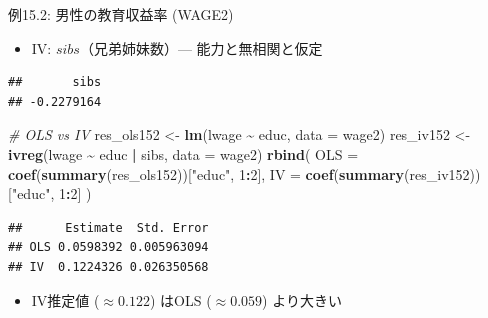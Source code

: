 \documentclass[
  ignorenonframetext,
]{beamer}
\newenvironment{Shaded}{\begin{snugshade}}{\end{snugshade}}
\newcommand{\AttributeTok}[1]{\textcolor[rgb]{0.13,0.29,0.53}{#1}}
\newcommand{\CommentTok}[1]{\textcolor[rgb]{0.56,0.35,0.01}{\textit{#1}}}
\newcommand{\DecValTok}[1]{\textcolor[rgb]{0.00,0.00,0.81}{#1}}
\newcommand{\FunctionTok}[1]{\textcolor[rgb]{0.13,0.29,0.53}{\textbf{#1}}}
\newcommand{\NormalTok}[1]{#1}
\newcommand{\OtherTok}[1]{\textcolor[rgb]{0.56,0.35,0.01}{#1}}
\newcommand{\SpecialCharTok}[1]{\textcolor[rgb]{0.81,0.36,0.00}{\textbf{#1}}}
\newcommand{\StringTok}[1]{\textcolor[rgb]{0.31,0.60,0.02}{#1}}
\providecommand{\tightlist}{%
  \setlength{\itemsep}{0pt}\setlength{\parskip}{0pt}}
\begin{document}
\begin{frame}[fragile]{例15.2: 男性の教育収益率 (WAGE2)}
\label{ux4f8b15.2-ux7537ux6027ux306eux6559ux80b2ux53ceux76caux7387-wage2}
\begin{itemize}
\tightlist
\item
  IV: \(sibs\)（兄弟姉妹数）--- 能力と無相関と仮定
\end{itemize}

\footnotesize

\begin{Shaded}
\end{Shaded}

\begin{verbatim}
##       sibs 
## -0.2279164
\end{verbatim}

\begin{Shaded}
\begin{Highlighting}[]
\CommentTok{\# OLS vs IV}
\NormalTok{res\_ols152 }\OtherTok{\textless{}{-}} \FunctionTok{lm}\NormalTok{(lwage }\SpecialCharTok{\textasciitilde{}}\NormalTok{ educ, }\AttributeTok{data =}\NormalTok{ wage2)}
\NormalTok{res\_iv152  }\OtherTok{\textless{}{-}} \FunctionTok{ivreg}\NormalTok{(lwage }\SpecialCharTok{\textasciitilde{}}\NormalTok{ educ }\SpecialCharTok{|}\NormalTok{ sibs, }\AttributeTok{data =}\NormalTok{ wage2)}
\FunctionTok{rbind}\NormalTok{(}
  \AttributeTok{OLS =} \FunctionTok{coef}\NormalTok{(}\FunctionTok{summary}\NormalTok{(res\_ols152))[}\StringTok{"educ"}\NormalTok{, }\DecValTok{1}\SpecialCharTok{:}\DecValTok{2}\NormalTok{],}
  \AttributeTok{IV  =} \FunctionTok{coef}\NormalTok{(}\FunctionTok{summary}\NormalTok{(res\_iv152))[}\StringTok{"educ"}\NormalTok{, }\DecValTok{1}\SpecialCharTok{:}\DecValTok{2}\NormalTok{]}
\NormalTok{)}
\end{Highlighting}
\end{Shaded}

\begin{verbatim}
##      Estimate  Std. Error
## OLS 0.0598392 0.005963094
## IV  0.1224326 0.026350568
\end{verbatim}

\normalsize

\begin{itemize}
\tightlist
\item
  IV推定値 (\(\approx 0.122\)) はOLS (\(\approx 0.059\)) より大きい
\end{itemize}
\end{frame}
\end{document}
